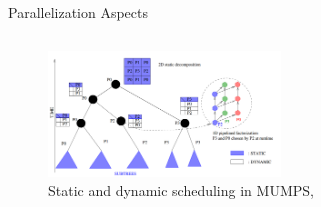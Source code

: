 \begin{frame}[t]{Parallelization Aspects}
\begin{columns}
\end{columns}

\begin{figure}[!htpb]
	\centering
	\includegraphics[width=0.55\textwidth]{figures/chapter-2/mumps-task-data-parallelism-2.png}
	\caption{Static and dynamic scheduling in MUMPS, \cite{l2012multifrontal}}
	\label{fig:mumps:mapping-and-scheduling}
\end{figure}

\end{frame}
